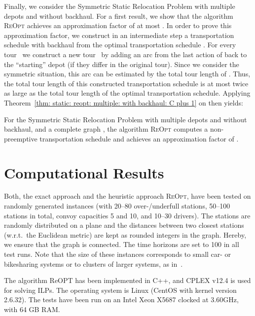 \documentclass[english]{llncs}
\numberwithin{sublemma}{lemma}
\newcommand{\REOPT}{\textsc{ReOpt}\xspace}
\begin{document}
Finally, we consider the Symmetric Static Relocation Problem with multiple depots and without backhaul.
For a first result, we show that the algorithm \REOPT achieves an approximation factor of at most .
In order to prove this approximation factor, we construct in an intermediate step a transportation schedule with backhaul  from the optimal transportation schedule .
For every tour~ we construct a new tour~ by adding an arc from the last action of  back to the ``starting'' depot (if they differ in the original tour).
Since we consider the symmetric situation, this arc can be estimated by the total tour length of .
Thus, the total tour length of this constructed transportation schedule is at most twice as large as the total tour length of the optimal transportation schedule.
Applying Theorem~\ref{thm: static: reopt: multiple: with backhaul: C plus 1} on  then yields:


\begin{theorem}\label{thm: static: reopt: multiple: symmetric: without backhaul: 2 C plus 1}
For the Symmetric Static Relocation Problem  with multiple depots and without backhaul, and a complete graph ,
the algorithm \REOPT computes a non-preemptive transportation schedule and achieves an approximation factor of .
\end{theorem}







\section{Computational Results}
\label{seq: computational}


Both, the exact approach and the heuristic approach \REOPT, have been tested on randomly generated instances (with 20--80 over-/underfull stations,
50--100 stations in total, convoy capacities 5 and 10, and 10--30 drivers).
The stations are randomly distributed on a plane and the distances between two closest stations (w.r.t.~the Euclidean metric) are kept as rounded integers in the graph.
Hereby, we ensure that the graph is connected.
The time horizons are set to 100 in all test runs.
Note that the size of these instances corresponds to small car- or bikesharing systems or to clusters of larger systems, as in~\cite{SHH-2013}.


The algorithm ReOPT has been implemented in C++, and CPLEX v12.4 is used for solving ILPs.
The operating system is Linux (CentOS with kernel version 2.6.32).
The tests have been run on an Intel Xeon X5687 clocked at 3.60GHz, with 64 GB RAM.
\end{document}
